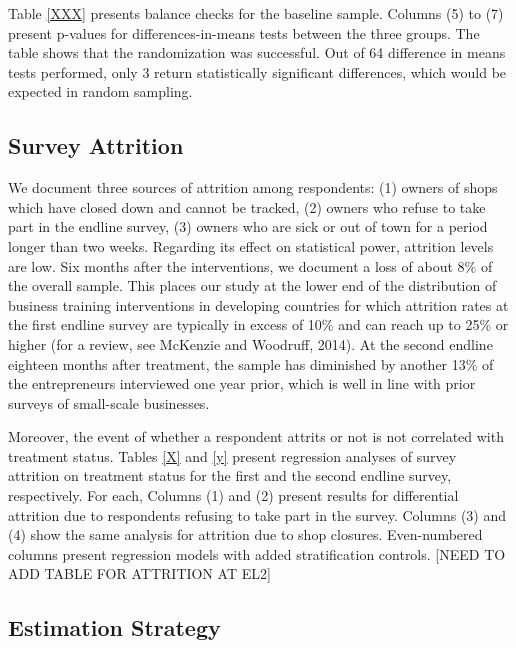 \documentclass[11.5pt]{article}
\begin{document}
Table \ref{XXX} presents balance checks for the baseline sample. Columns (5) to (7) present p-values for differences-in-means tests between the three groups. The table shows that the randomization was successful. Out of 64 difference in means tests performed, only 3 return statistically significant differences, which would be expected in random sampling.

\subsection{Survey Attrition}

We document three sources of attrition among respondents: (1) owners of shops which have closed down and cannot be tracked, (2) owners who refuse to take part in the endline survey, (3) owners who are sick or out of town for a period longer than two weeks. Regarding its effect on statistical power, attrition levels are low. Six months after the interventions, we document a loss of about 8\% of the overall sample. This places our study at the lower end of the distribution of business training interventions in developing countries for which attrition rates at the first endline survey are typically in excess of 10\% and can reach up to 25\% or higher (for a review, see McKenzie and Woodruff, 2014). At the second endline eighteen months after treatment, the sample has diminished by another 13\% of the entrepreneurs interviewed one year prior, which is well in line with prior surveys of small-scale businesses. %

Moreover, the event of whether a respondent attrits or not is not correlated with treatment status. Tables \ref{X} and \ref{y} present regression analyses of survey attrition on treatment status for the first and the second endline survey, respectively. For each, Columns (1) and (2) present results for differential attrition due to respondents refusing to take part in the survey. Columns (3) and (4) show the same analysis for attrition due to shop closures. Even-numbered columns present regression models with added stratification controls. [\textcolor[rgb]{0.00,0.00,0.00}{NEED TO ADD TABLE FOR ATTRITION AT EL2}]

\subsection{Estimation Strategy}

\end{document}
